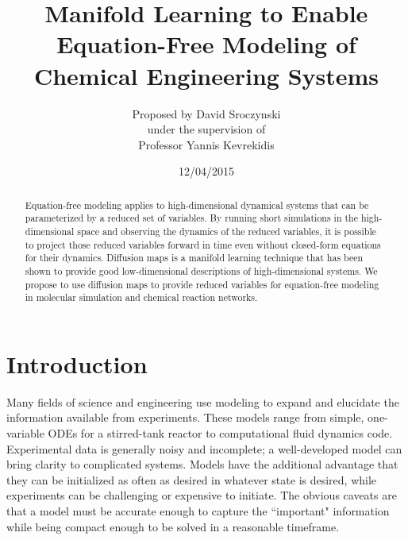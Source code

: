 \documentclass[12pt]{article}
\begin{document}
\title{Manifold Learning to Enable Equation-Free Modeling of Chemical Engineering Systems}
\author{\LARGE Proposed by David Sroczynski\vspace{3mm}\\\Large under the supervision of\vspace{3mm}\\\LARGE Professor Yannis Kevrekidis}
\date{12/04/2015}
\maketitle
\thispagestyle{empty}
\vspace{20mm}
\begin{abstract}
Equation-free modeling applies to high-dimensional dynamical systems that can be parameterized by a reduced set of variables. By running short simulations in the high-dimensional space and observing the dynamics of the reduced variables, it is possible to project those reduced variables forward in time even without closed-form equations for their dynamics. Diffusion maps is a manifold learning technique that has been shown to provide good low-dimensional descriptions of high-dimensional systems. We propose to use diffusion maps to provide reduced variables for equation-free modeling in molecular simulation and chemical reaction networks.
\end{abstract}
\clearpage
\tableofcontents
\thispagestyle{empty}
\clearpage
{}
\section{Introduction}
Many fields of science and engineering use modeling to expand and elucidate the information available from experiments. These models range from simple, one-variable ODEs for a stirred-tank reactor to computational fluid dynamics code. Experimental data is generally noisy and incomplete; a well-developed model can bring clarity to complicated systems. Models have the additional advantage that they can be initialized as often as desired in whatever state is desired, while experiments can be challenging or expensive to initiate. The obvious caveats are that a model must be accurate enough to capture the ``important" information while being compact enough to be solved in a reasonable timeframe.\vspace{1mm}
\end{document}
